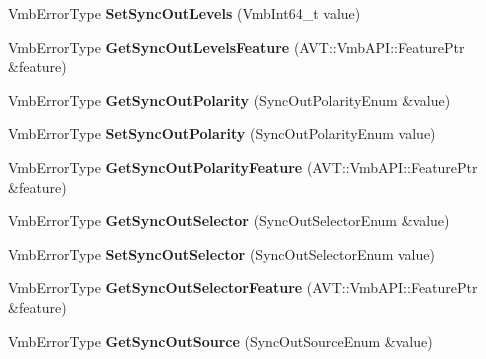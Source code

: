 \begin{DoxyCompactItemize}
\item 
\hypertarget{classMakoCamera_a22bd73c5ac05ae13197b28e134e7e2b7}{Vmb\-Error\-Type {\bfseries Set\-Sync\-Out\-Levels} (Vmb\-Int64\-\_\-t value)}\label{classMakoCamera_a22bd73c5ac05ae13197b28e134e7e2b7}

\item 
\hypertarget{classMakoCamera_ab42d6905f31755581297d240ffc01dae}{Vmb\-Error\-Type {\bfseries Get\-Sync\-Out\-Levels\-Feature} (A\-V\-T\-::\-Vmb\-A\-P\-I\-::\-Feature\-Ptr \&feature)}\label{classMakoCamera_ab42d6905f31755581297d240ffc01dae}

\item 
\hypertarget{classMakoCamera_a671fc62afa7b76a26c0e273057db9214}{Vmb\-Error\-Type {\bfseries Get\-Sync\-Out\-Polarity} (Sync\-Out\-Polarity\-Enum \&value)}\label{classMakoCamera_a671fc62afa7b76a26c0e273057db9214}

\item 
\hypertarget{classMakoCamera_a186f09eaa991ad702b96987f4703370e}{Vmb\-Error\-Type {\bfseries Set\-Sync\-Out\-Polarity} (Sync\-Out\-Polarity\-Enum value)}\label{classMakoCamera_a186f09eaa991ad702b96987f4703370e}

\item 
\hypertarget{classMakoCamera_add3cda0ac91d3af774708df5aad9d20d}{Vmb\-Error\-Type {\bfseries Get\-Sync\-Out\-Polarity\-Feature} (A\-V\-T\-::\-Vmb\-A\-P\-I\-::\-Feature\-Ptr \&feature)}\label{classMakoCamera_add3cda0ac91d3af774708df5aad9d20d}

\item 
\hypertarget{classMakoCamera_a993405de383b2c0b63f945f2b986eaef}{Vmb\-Error\-Type {\bfseries Get\-Sync\-Out\-Selector} (Sync\-Out\-Selector\-Enum \&value)}\label{classMakoCamera_a993405de383b2c0b63f945f2b986eaef}

\item 
\hypertarget{classMakoCamera_ad6363f340bdfd01527e08b52e6eafe15}{Vmb\-Error\-Type {\bfseries Set\-Sync\-Out\-Selector} (Sync\-Out\-Selector\-Enum value)}\label{classMakoCamera_ad6363f340bdfd01527e08b52e6eafe15}

\item 
\hypertarget{classMakoCamera_a93554cfab7b0c6c1839f4d47819527ce}{Vmb\-Error\-Type {\bfseries Get\-Sync\-Out\-Selector\-Feature} (A\-V\-T\-::\-Vmb\-A\-P\-I\-::\-Feature\-Ptr \&feature)}\label{classMakoCamera_a93554cfab7b0c6c1839f4d47819527ce}

\item 
\hypertarget{classMakoCamera_a417a4ae7397212015a5700174b6b8e6d}{Vmb\-Error\-Type {\bfseries Get\-Sync\-Out\-Source} (Sync\-Out\-Source\-Enum \&value)}\label{classMakoCamera_a417a4ae7397212015a5700174b6b8e6d}


\end{DoxyCompactItemize}
